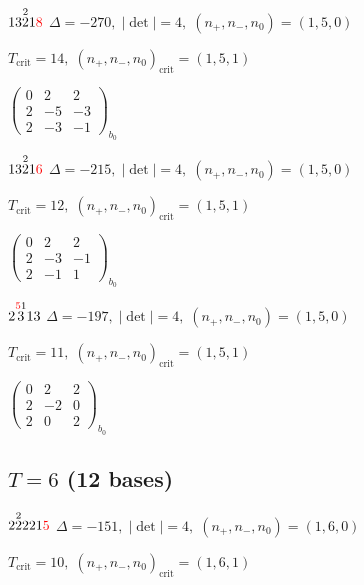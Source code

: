 \documentclass[10pt]{article}
\begin{document}
$13\overset{2}{2}1\textcolor{red}{8}$ \quad $\Delta=-270,\; |\det|=4,\; (n_+,n_-,n_0)=(1,5,0)$

\hspace{1em}$T_{\text{crit}}=14,\; (n_+,n_-,n_0)_{\text{crit}}=(1,5,1)$

\hspace{2em}$\left(\begin{smallmatrix}0 & 2 & 2 \\ 2 & -5 & -3 \\ 2 & -3 & -1\end{smallmatrix}\right)_{\!b_0}$

$13\overset{2}{2}1\textcolor{red}{6}$ \quad $\Delta=-215,\; |\det|=4,\; (n_+,n_-,n_0)=(1,5,0)$

\hspace{1em}$T_{\text{crit}}=12,\; (n_+,n_-,n_0)_{\text{crit}}=(1,5,1)$

\hspace{2em}$\left(\begin{smallmatrix}0 & 2 & 2 \\ 2 & -3 & -1 \\ 2 & -1 & 1\end{smallmatrix}\right)_{\!b_0}$

\smallskip

$2\overset{\textcolor{red}{5}1}{3}13$ \quad $\Delta=-197,\; |\det|=4,\; (n_+,n_-,n_0)=(1,5,0)$

\hspace{1em}$T_{\text{crit}}=11,\; (n_+,n_-,n_0)_{\text{crit}}=(1,5,1)$

\hspace{2em}$\left(\begin{smallmatrix}0 & 2 & 2 \\ 2 & -2 & 0 \\ 2 & 0 & 2\end{smallmatrix}\right)_{\!b_0}$


\subsection*{$T = 6$ \quad (12 bases)}
\smallskip

$2\overset{2}{2}221\textcolor{red}{5}$ \quad $\Delta=-151,\; |\det|=4,\; (n_+,n_-,n_0)=(1,6,0)$

\hspace{1em}$T_{\text{crit}}=10,\; (n_+,n_-,n_0)_{\text{crit}}=(1,6,1)$
\end{document}
